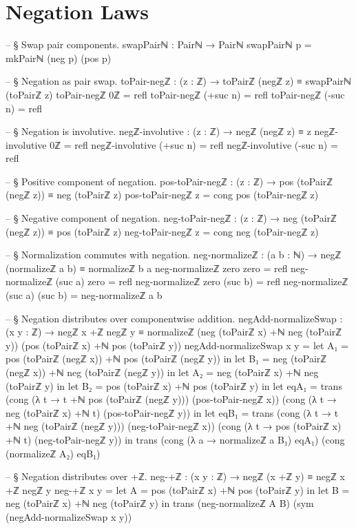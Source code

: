 \documentclass[11pt,a4paper]{book}
\begin{document}
\section{Negation Laws}

\begin{code}
-- § Swap pair components.
swapPairℕ : Pairℕ → Pairℕ
swapPairℕ p = mkPairℕ (neg p) (pos p)

-- § Negation as pair swap.
toPair-negℤ : (z : ℤ) → toPairℤ (negℤ z) ≡ swapPairℕ (toPairℤ z)
toPair-negℤ 0ℤ = refl
toPair-negℤ (+suc n) = refl
toPair-negℤ (-suc n) = refl

-- § Negation is involutive.
negℤ-involutive : (z : ℤ) → negℤ (negℤ z) ≡ z
negℤ-involutive 0ℤ = refl
negℤ-involutive (+suc n) = refl
negℤ-involutive (-suc n) = refl

-- § Positive component of negation.
pos-toPair-negℤ : (z : ℤ) → pos (toPairℤ (negℤ z)) ≡ neg (toPairℤ z)
pos-toPair-negℤ z = cong pos (toPair-negℤ z)

-- § Negative component of negation.
neg-toPair-negℤ : (z : ℤ) → neg (toPairℤ (negℤ z)) ≡ pos (toPairℤ z)
neg-toPair-negℤ z = cong neg (toPair-negℤ z)

-- § Normalization commutes with negation.
neg-normalizeℤ : (a b : ℕ) → negℤ (normalizeℤ a b) ≡ normalizeℤ b a
neg-normalizeℤ zero zero = refl
neg-normalizeℤ (suc a) zero = refl
neg-normalizeℤ zero (suc b) = refl
neg-normalizeℤ (suc a) (suc b) = neg-normalizeℤ a b

-- § Negation distributes over componentwise addition.
negAdd-normalizeSwap : (x y : ℤ) →
  negℤ x +ℤ negℤ y ≡
  normalizeℤ (neg (toPairℤ x) +ℕ neg (toPairℤ y)) (pos (toPairℤ x) +ℕ pos (toPairℤ y))
negAdd-normalizeSwap x y =
  let A₁ = pos (toPairℤ (negℤ x)) +ℕ pos (toPairℤ (negℤ y)) in
  let B₁ = neg (toPairℤ (negℤ x)) +ℕ neg (toPairℤ (negℤ y)) in
  let A₂ = neg (toPairℤ x) +ℕ neg (toPairℤ y) in
  let B₂ = pos (toPairℤ x) +ℕ pos (toPairℤ y) in
  let eqA₁ =
        trans
          (cong (λ t → t +ℕ pos (toPairℤ (negℤ y))) (pos-toPair-negℤ x))
          (cong (λ t → neg (toPairℤ x) +ℕ t) (pos-toPair-negℤ y))
      in
  let eqB₁ =
        trans
          (cong (λ t → t +ℕ neg (toPairℤ (negℤ y))) (neg-toPair-negℤ x))
          (cong (λ t → pos (toPairℤ x) +ℕ t) (neg-toPair-negℤ y))
      in
  trans (cong (λ a → normalizeℤ a B₁) eqA₁)
        (cong (normalizeℤ A₂) eqB₁)

-- § Negation distributes over +ℤ.
neg-+ℤ : (x y : ℤ) → negℤ (x +ℤ y) ≡ negℤ x +ℤ negℤ y
neg-+ℤ x y =
  let A = pos (toPairℤ x) +ℕ pos (toPairℤ y) in
  let B = neg (toPairℤ x) +ℕ neg (toPairℤ y) in
  trans (neg-normalizeℤ A B) (sym (negAdd-normalizeSwap x y))


\end{code}
\end{document}
